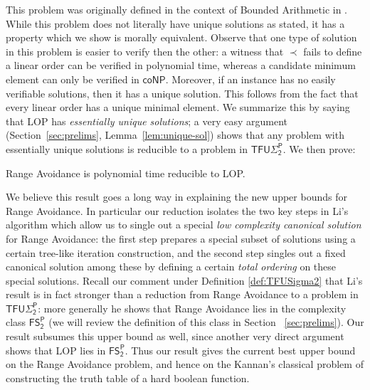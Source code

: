 This problem was originally defined in the context of Bounded Arithmetic in \cite{Chiari1998-CHIWFI}. While this problem does not literally have unique solutions as stated, it has a property which we show is morally equivalent. Observe that one type of solution in this problem is easier to verify then the other: a witness that $\prec$ fails to define a linear order can be verified in polynomial time, whereas a candidate minimum element can only be verified in $\mathsf{coNP}$. Moreover, if an instance has no easily verifiable solutions, then it has a unique solution. This follows from the fact that every linear order has a unique minimal element. We summarize this by saying that LOP has \emph{essentially unique solutions}; a very easy argument (Section~\ref{sec:prelims}, Lemma~\ref{lem:unique-sol}) shows that any problem with essentially unique solutions is reducible to a problem in $\mathsf{TFU\Sigma_2^P}$. We then prove:

\begin{theorem}

Range Avoidance is polynomial time reducible to LOP.
\end{theorem}

We believe this result goes a long way in explaining the new upper bounds for Range Avoidance. In particular our reduction isolates the two key steps in Li's algorithm which allow us to single out a special \emph{low complexity canonical solution} for Range Avoidance: the first step prepares a special subset of solutions using a certain tree-like iteration construction, and the second step singles out a fixed canonical solution among these by defining a certain \emph{total ordering} on these special solutions.  Recall our comment under Definition \ref{def:TFUSigma2} that Li's result is in fact stronger than a reduction from Range Avoidance to a problem in $\mathsf{TFU\Sigma_2^P}$: more generally he shows that Range Avoidance lies in the complexity class $\mathsf{FS_2^P}$ (we will review the definition of this class in Section ~\ref{sec:prelims}). Our result subsumes this upper bound as well, since another very direct argument shows that LOP lies in $\mathsf{FS_2^P}$. Thus our result gives the current best upper bound on the Range Avoidance problem, and hence on the Kannan's classical problem of constructing the truth table of a hard boolean function. 

